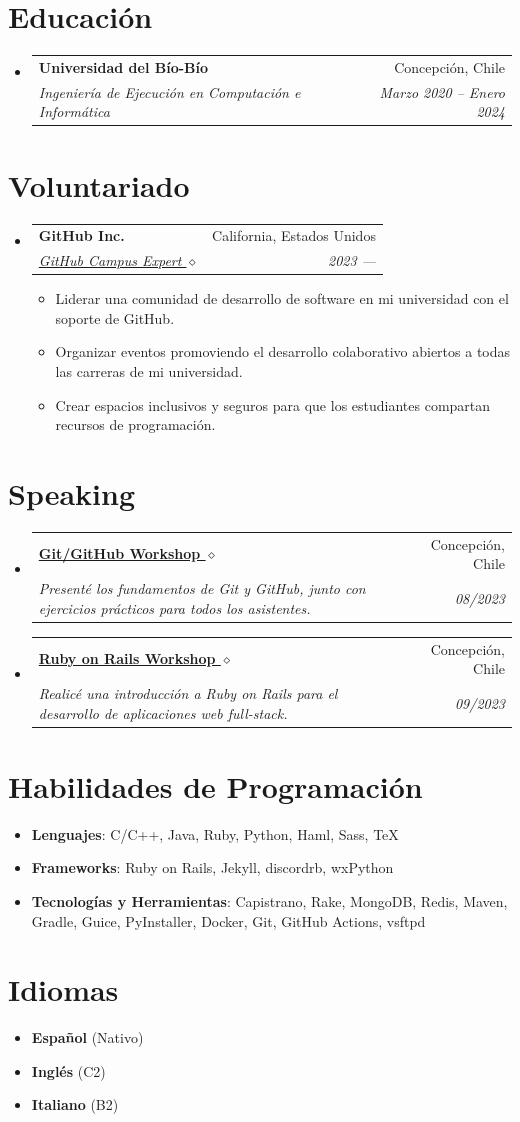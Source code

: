 \documentclass[letterpaper,11pt]{article}
\makeatletter
\newcommand{\resumeSubheading}[4]{
  \vspace{-1pt}\item
    \begin{tabular*}{0.97\textwidth}[t]{l@{\extracolsep{\fill}}r}
      \textbf{#1} & #2 \\
      \textit{\small#3} & \textit{\small #4} \\
    \end{tabular*}\vspace{-5pt}
}
\newcommand{\resumeSubHeadingListStart}{\begin{itemize}[leftmargin=*]}
\newcommand{\resumeSubHeadingListEnd}{\end{itemize}}
\newcommand{\resumeItemListStart}{\begin{itemize}}
\newcommand{\resumeItemListEnd}{\end{itemize}\vspace{-5pt}}
\makeatother
\begin{document}
  \section{Educación}
  \resumeSubHeadingListStart
    \resumeSubheading
      {Universidad del Bío-Bío}{Concepción, Chile}
      {Ingeniería de Ejecución en Computación e Informática}{Marzo 2020 -- Enero 2024}
  \resumeSubHeadingListEnd
  
\section{Voluntariado}
  \resumeSubHeadingListStart
    \resumeSubheading
    {GitHub Inc.}{California, Estados Unidos}
    {\href{https://githubcampus.expert/BGMP}{GitHub Campus Expert $\diamond$}}{2023 ---}
    \resumeItemListStart
      \item{Liderar una comunidad de desarrollo de software en mi universidad con el soporte de GitHub.}
      \item{Organizar eventos promoviendo el desarrollo colaborativo abiertos a todas las carreras de mi universidad.}
      \item{Crear espacios inclusivos y seguros para que los estudiantes compartan recursos de programación.}
    \resumeItemListEnd
   \resumeSubHeadingListEnd

\section{Speaking}
\resumeSubHeadingListStart
  \resumeSubheading
  {\href{https://bgm.cl/about}{Git/GitHub Workshop $\diamond$}}{Concepción, Chile}
  {Presenté los fundamentos de Git y GitHub, junto con ejercicios prácticos para todos los asistentes.}{08/2023}
  \resumeSubheading
  {\href{https://bgm.cl/about}{Ruby on Rails Workshop $\diamond$}}{Concepción, Chile}
  {Realicé una introducción a Ruby on Rails para el desarrollo de aplicaciones web full-stack.}{09/2023}
\resumeSubHeadingListEnd

\section{Habilidades de Programación}
  \resumeSubHeadingListStart
    \item{
      \textbf{Lenguajes}{: C/C++, Java, Ruby, Python, Haml, Sass, TeX}
    }
    \item{
      \textbf{Frameworks}{: Ruby on Rails, Jekyll, discordrb, wxPython}
    }
    \item{
      \textbf{Tecnologías y Herramientas}{: Capistrano, Rake, MongoDB, Redis, Maven, Gradle, Guice, PyInstaller, Docker, Git, GitHub Actions, vsftpd}
    }
  \resumeSubHeadingListEnd

\section{Idiomas}
\resumeSubHeadingListStart
\item{
  \textbf{Español}{ (Nativo)}
}
\item{
  \textbf{Inglés}{ (C2)}
}
\item{
  \textbf{Italiano}{ (B2)}
}
\resumeSubHeadingListEnd

\end{document}
